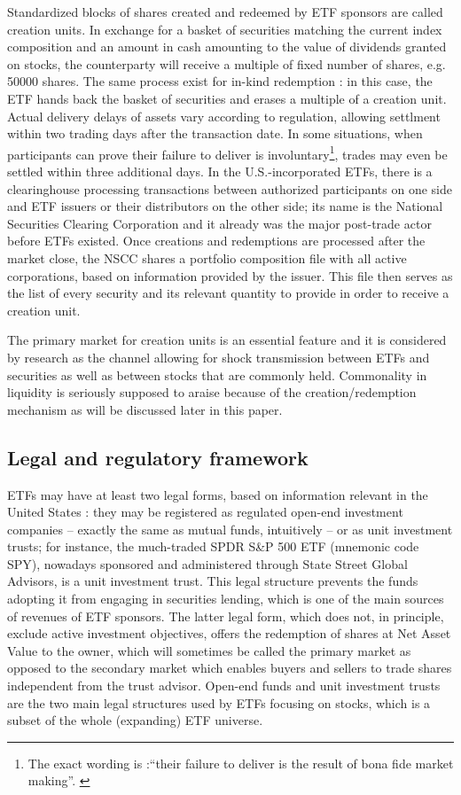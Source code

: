 Standardized blocks of shares created and redeemed by ETF sponsors are called creation units. In exchange for a basket of securities matching the current index composition and an amount in cash amounting to the value of dividends granted on stocks, the counterparty will receive a multiple of fixed number of shares, e.g. 50000 shares. The same process exist for in-kind redemption : in this case, the ETF hands back the basket of securities and erases a multiple of a creation unit. Actual delivery delays of assets vary according to regulation, allowing settlment within two trading days after the transaction date. In some situations, when participants can prove their failure to deliver is involuntary\footnote{The exact wording is :``their failure to deliver is the result of bona fide market making''. \parencite{Ben-David2017}}, trades may even be settled within three additional days. In the U.S.-incorporated ETFs, there is a clearinghouse processing transactions between authorized participants on one side and ETF issuers or their distributors on the other side; its name is the National Securities Clearing Corporation and it already was the major post-trade actor before ETFs existed. Once creations and redemptions are processed after the market close, the NSCC shares a portfolio composition file with all active corporations, based on information provided by the issuer. This file then serves as the list of every security and its relevant quantity to provide in order to receive a creation unit.

The primary market for creation units is an essential feature and it is considered by research as the channel allowing for shock transmission between ETFs and securities as well as between stocks that are commonly held. Commonality in liquidity is seriously supposed to araise because of the creation/redemption mechanism as will be discussed later in this paper.

\subsection{Legal and regulatory framework}
ETFs may have at least two legal forms, based on information relevant in the United States : they may be registered as regulated open-end investment companies -- exactly the same as mutual funds, intuitively -- or as unit investment trusts; for instance, the much-traded SPDR S\&P 500 ETF (mnemonic code SPY), nowadays sponsored and administered through State Street Global Advisors, is a unit investment trust. This legal structure prevents the funds adopting it from engaging in securities lending, which is one of the main sources of revenues of ETF sponsors. The latter legal form, which does not, in principle, exclude active investment objectives, offers the redemption of shares at Net Asset Value to the owner, which will sometimes be called the primary market as opposed to the secondary market which enables buyers and sellers to trade shares independent from the trust advisor. Open-end funds and unit investment trusts are the two main legal structures used by ETFs focusing on stocks, which is a subset of the whole (expanding) ETF universe.

